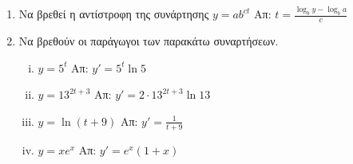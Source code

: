 \begin{enumerate}
    \item Να βρεθεί η αντίστροφη της συνάρτησης $ y = ab^{ct}$ \hfill Απ: $ t = \frac{\log_{b}{y} -
        \log_{b}{a}}{c} $ 

    \item Να βρεθούν οι παράγωγοι των παρακάτω συναρτήσεων.

        \begin{enumerate}[i)]
            \item $ y = 5^{t} $ \hfill Απ: $ y'=5^{t} \ln{5} $
            \item $ y = 13^{2t+3} $ \hfill Απ: $ y' = 2\cdot 13^{2t+3} \ln{13}  $ 
            \item $ y = \ln{(t+9)} $ \hfill Απ: $y'= \frac{1}{t+9} $
            \item $ y = xe^{x} $ \hfill Απ: $ y'=e^{x}(1+x) $ 
        \end{enumerate}
\end{enumerate}



